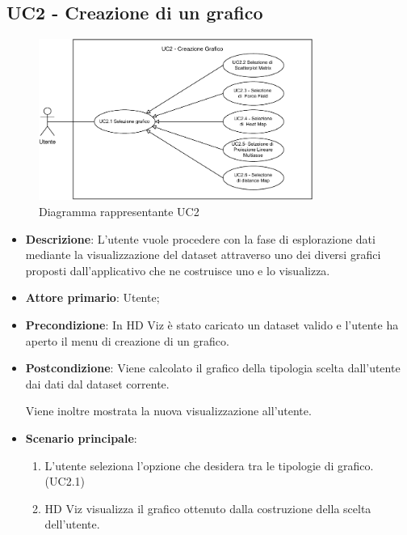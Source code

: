 \newpage

\subsection{UC2 - Creazione di un grafico}
\label{sub:uc2}

\begin{figure}[h]
    \centering
    \includegraphics[width=0.8\textwidth]{componenti/casi-duso/diagrammi/UC2.pdf}
    \caption{Diagramma rappresentante UC2}
    \label{fig:UC2}
\end{figure}


\begin{itemize}
    \item \textbf{Descrizione}: L’utente vuole procedere con la fase di esplorazione
                                dati mediante la visualizzazione del dataset
                                attraverso uno dei diversi grafici proposti dall’applicativo
                                che ne costruisce uno e lo visualizza.
	
    \item \textbf{Attore primario}: Utente;
    
    \item \textbf{Precondizione}:   In HD Viz è stato caricato un dataset valido e
									l'utente ha aperto il menu di creazione di un grafico.

    \item \textbf{Postcondizione}:  Viene calcolato il grafico della tipologia scelta dall'utente dai dati 
									dal dataset corrente. 
									
									Viene inoltre mostrata la nuova visualizzazione all'utente.

	\item \textbf{Scenario principale}:
		\begin{enumerate}
			\item L'utente seleziona l'opzione che desidera tra le tipologie di grafico. (UC2.1)
			\item HD Viz visualizza il grafico ottenuto dalla costruzione della scelta dell'utente.
		\end{enumerate}
\end{itemize}

